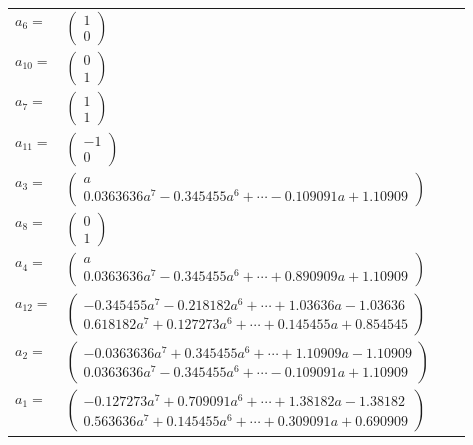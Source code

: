 \documentclass[1p]{elsarticle_modified}
\theoremstyle{definition}
\begin{document}
\begin{tabular}{m{7pt} m{180pt} m{7pt} m{180pt} }
\flushright $a_{6}=$&$\begin{pmatrix}1\\0\end{pmatrix}$ \\
\flushright $a_{10}=$&$\begin{pmatrix}0\\1\end{pmatrix}$ \\
\flushright $a_{7}=$&$\begin{pmatrix}1\\1\end{pmatrix}$ \\
\flushright $a_{11}=$&$\begin{pmatrix}-1\\0\end{pmatrix}$ \\
\flushright $a_{3}=$&$\begin{pmatrix}a\\0.0363636 a^{7}-0.345455 a^{6}+\cdots-0.109091 a+1.10909\end{pmatrix}$ \\
\flushright $a_{8}=$&$\begin{pmatrix}0\\1\end{pmatrix}$ \\
\flushright $a_{4}=$&$\begin{pmatrix}a\\0.0363636 a^{7}-0.345455 a^{6}+\cdots+0.890909 a+1.10909\end{pmatrix}$ \\
\flushright $a_{12}=$&$\begin{pmatrix}-0.345455 a^{7}-0.218182 a^{6}+\cdots+1.03636 a-1.03636\\0.618182 a^{7}+0.127273 a^{6}+\cdots+0.145455 a+0.854545\end{pmatrix}$ \\
\flushright $a_{2}=$&$\begin{pmatrix}-0.0363636 a^{7}+0.345455 a^{6}+\cdots+1.10909 a-1.10909\\0.0363636 a^{7}-0.345455 a^{6}+\cdots-0.109091 a+1.10909\end{pmatrix}$ \\
\flushright $a_{1}=$&$\begin{pmatrix}-0.127273 a^{7}+0.709091 a^{6}+\cdots+1.38182 a-1.38182\\0.563636 a^{7}+0.145455 a^{6}+\cdots+0.309091 a+0.690909\end{pmatrix}$ \\

\end{tabular}
\end{document}
